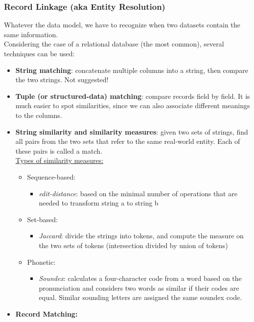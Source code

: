 \documentclass[10pt,a4paper]{article}
\begin{document}
\subsubsection{Record Linkage (aka Entity Resolution)}
Whatever the data model, we have to recognize when two datasets contain the same information. \\ 
Considering the case of a relational database (the most common), several techniques can be used:
\begin{itemize}
	\item \textbf{String matching}: concatenate multiple columns into a string, then compare the two strings. Not suggested!
	\item \textbf{Tuple (or structured-data) matching}: compare records field by field. It is much easier to spot similarities, since we can also associate different meanings to the columns.
	\item \textbf{String similarity and similarity measures}: given two sets of strings, find all pairs from the two sets that refer to the same real-world entity. Each of these pairs is called a match.  \\
	\uline{Types of similarity measures:}
	\begin{itemize}
		\item Sequence-based: 
		\begin{itemize}
			\item \textit{edit-distance}: based on the minimal number of operations that are needed to transform string a to string b
\end{itemize}
		\pagebreak
		\item Set-based:
		\begin{itemize}
			\item \textit{Jaccard}: divide the strings into tokens, and compute the measure on the two sets of tokens (intersection divided by union of tokens)
		\end{itemize}
		\item Phonetic:
		\begin{itemize}
			\item \textit{Soundex}: calculates a four-character code from a word based on the pronunciation and considers two words as similar if their codes are equal. Similar sounding letters are assigned the same soundex code.
		\end{itemize}
	\end{itemize}
	\item \textbf{Record Matching:}
	\begin{itemize}

\end{itemize}
\end{itemize}
\end{document}
